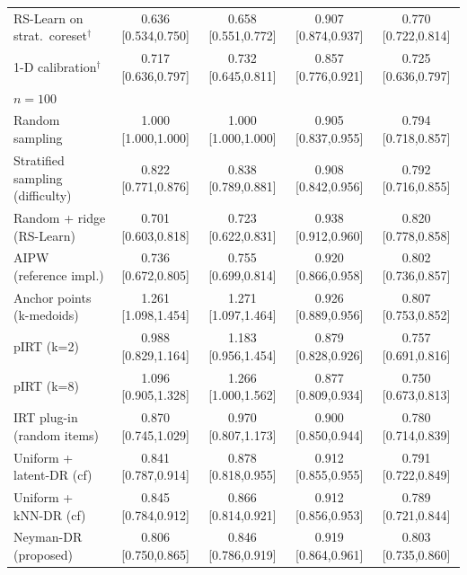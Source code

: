 \begin{tabular}{l cccc}
RS-Learn on strat.\ coreset$^\dagger$ & 0.636 {\scriptsize[0.534,0.750]} & 0.658 {\scriptsize[0.551,0.772]} & 0.907 {\scriptsize[0.874,0.937]} & 0.770 {\scriptsize[0.722,0.814]} \\
1-D calibration$^\dagger$ & 0.717 {\scriptsize[0.636,0.797]} & 0.732 {\scriptsize[0.645,0.811]} & 0.857 {\scriptsize[0.776,0.921]} & 0.725 {\scriptsize[0.636,0.797]} \\
\midrule
\multicolumn{5}{l}{\emph{$n=100$}}\\
Random sampling & 1.000 {\scriptsize[1.000,1.000]} & 1.000 {\scriptsize[1.000,1.000]} & 0.905 {\scriptsize[0.837,0.955]} & 0.794 {\scriptsize[0.718,0.857]} \\
Stratified sampling (difficulty) & 0.822 {\scriptsize[0.771,0.876]} & 0.838 {\scriptsize[0.789,0.881]} & 0.908 {\scriptsize[0.842,0.956]} & 0.792 {\scriptsize[0.716,0.855]} \\
Random + ridge (RS-Learn) & 0.701 {\scriptsize[0.603,0.818]} & 0.723 {\scriptsize[0.622,0.831]} & 0.938 {\scriptsize[0.912,0.960]} & 0.820 {\scriptsize[0.778,0.858]} \\
AIPW (reference impl.) & 0.736 {\scriptsize[0.672,0.805]} & 0.755 {\scriptsize[0.699,0.814]} & 0.920 {\scriptsize[0.866,0.958]} & 0.802 {\scriptsize[0.736,0.857]} \\
Anchor points (k-medoids) & 1.261 {\scriptsize[1.098,1.454]} & 1.271 {\scriptsize[1.097,1.464]} & 0.926 {\scriptsize[0.889,0.956]} & 0.807 {\scriptsize[0.753,0.852]} \\
pIRT (k=2) & 0.988 {\scriptsize[0.829,1.164]} & 1.183 {\scriptsize[0.956,1.454]} & 0.879 {\scriptsize[0.828,0.926]} & 0.757 {\scriptsize[0.691,0.816]} \\
pIRT (k=8) & 1.096 {\scriptsize[0.905,1.328]} & 1.266 {\scriptsize[1.000,1.562]} & 0.877 {\scriptsize[0.809,0.934]} & 0.750 {\scriptsize[0.673,0.813]} \\
IRT plug-in (random items) & 0.870 {\scriptsize[0.745,1.029]} & 0.970 {\scriptsize[0.807,1.173]} & 0.900 {\scriptsize[0.850,0.944]} & 0.780 {\scriptsize[0.714,0.839]} \\
Uniform + latent-DR (cf) & 0.841 {\scriptsize[0.787,0.914]} & 0.878 {\scriptsize[0.818,0.955]} & 0.912 {\scriptsize[0.855,0.955]} & 0.791 {\scriptsize[0.722,0.849]} \\
Uniform + kNN-DR (cf) & 0.845 {\scriptsize[0.784,0.912]} & 0.866 {\scriptsize[0.814,0.921]} & 0.912 {\scriptsize[0.856,0.953]} & 0.789 {\scriptsize[0.721,0.844]} \\
Neyman-DR (proposed) & 0.806 {\scriptsize[0.750,0.865]} & 0.846 {\scriptsize[0.786,0.919]} & 0.919 {\scriptsize[0.864,0.961]} & 0.803 {\scriptsize[0.735,0.860]} \\

\end{tabular}
